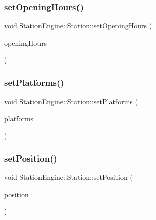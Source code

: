 \mbox{\label{classQRail_1_1StationEngine_1_1Station_a77c5ed806a41ad53afa4c03f96525bad}} 
\subsubsection{\texorpdfstring{setOpeningHours()}{setOpeningHours()}}
{\footnotesize\ttfamily void Station\+Engine\+::\+Station\+::set\+Opening\+Hours (\begin{DoxyParamCaption}\item[{const Q\+Map$<$ \mbox{\hyperlink{classQRail_1_1StationEngine_1_1Station_ae8c109a1d5ce2bb41959e62e32392631}{Station\+Engine\+::\+Station\+::\+Day}}, Q\+Pair$<$ Q\+Time, Q\+Time $>$ $>$ \&}]{opening\+Hours }\end{DoxyParamCaption})}

\mbox{\label{classQRail_1_1StationEngine_1_1Station_ab275347465eb810b7c8f2a6e1802feb4}} 
\subsubsection{\texorpdfstring{setPlatforms()}{setPlatforms()}}
{\footnotesize\ttfamily void Station\+Engine\+::\+Station\+::set\+Platforms (\begin{DoxyParamCaption}\item[{const Q\+Map$<$ Q\+Url, Q\+String $>$ \&}]{platforms }\end{DoxyParamCaption})}

\mbox{\label{classQRail_1_1StationEngine_1_1Station_ae336cacb81a3a6832e74a6a6c7c81242}} 
\subsubsection{\texorpdfstring{setPosition()}{setPosition()}}
{\footnotesize\ttfamily void Station\+Engine\+::\+Station\+::set\+Position (\begin{DoxyParamCaption}\item[{const Q\+Geo\+Coordinate \&}]{position }\end{DoxyParamCaption})}

